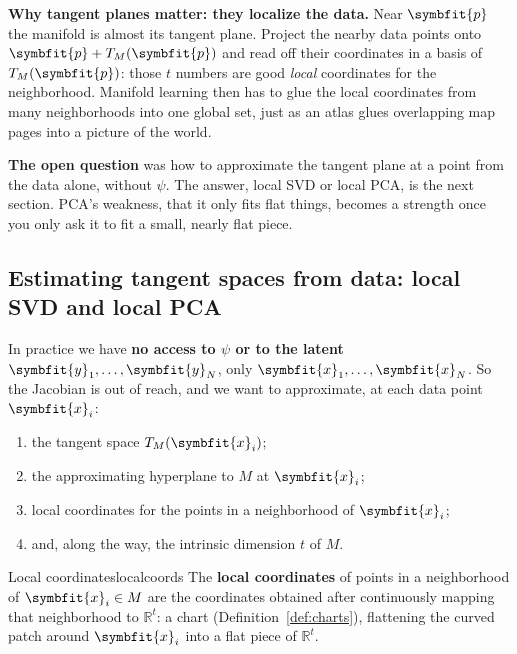 \documentclass[11pt]{article}
\newcommand{\bm}[1]{\symbfit{#1}}
\newcommand{\R}{\mathbb{R}}
\newcommand{\vx}{\bm{x}}
\begin{document}
\begin{intuition}
\textbf{Why tangent planes matter: they localize the data.} Near $\bm p$ the manifold is almost its tangent plane. Project
the nearby data points onto $\bm p+T_M(\bm p)$ and read off their coordinates in a basis of $T_M(\bm p)$: those $t$ numbers are good
\emph{local} coordinates for the neighborhood. Manifold learning then has to glue the local coordinates from many
neighborhoods into one global set, just as an atlas glues overlapping map pages into a picture of the world.
\end{intuition}

\begin{deeper}
\textbf{The open question} was how to approximate the tangent plane at a point from the data alone, without $\psi$. The
answer, local SVD or local PCA, is the next section. PCA's weakness, that it only fits flat things, becomes a strength
once you only ask it to fit a small, nearly flat piece.
\end{deeper}

\subsection{Estimating tangent spaces from data: local SVD and local PCA}\label{sec:localpca}

In practice we have \textbf{no access to $\psi$ or to the latent $\bm y_1,\dots,\bm y_N$}, only $\vx_1,\dots,\vx_N$. So the Jacobian is out of
reach, and we want to approximate, at each data point $\vx_i$:
\begin{enumerate}[nosep,label=\arabic*)]
\item the tangent space $T_M(\vx_i)$;
\item the approximating hyperplane to $M$ at $\vx_i$;
\item local coordinates for the points in a neighborhood of $\vx_i$;
\item and, along the way, the intrinsic dimension $t$ of $M$.
\end{enumerate}

\begin{definition}{Local coordinates}{localcoords}
The \textbf{local coordinates} of points in a neighborhood of $\vx_i\in M$ are the coordinates obtained after continuously
mapping that neighborhood to $\R^t$: a chart (Definition~\ref{def:charts}), flattening the curved patch around $\vx_i$ into a
flat piece of $\R^t$.
\end{definition}
\end{document}
